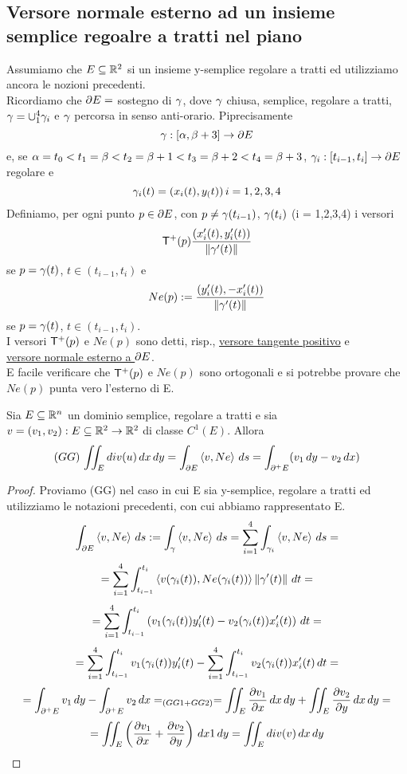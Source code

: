 \subsection{Versore normale esterno ad un insieme semplice regoalre a tratti nel piano}
Assumiamo che $E\subseteq\mathbb{R}^2$ si un insieme y-semplice regolare a tratti ed utilizziamo 
ancora le nozioni precedenti.\\
Ricordiamo che $\partial E = $ sostegno di $\gamma$, dove $\gamma$ \ace chiusa, semplice, regolare 
a tratti, $\gamma = \cup_{1}^{4} \gamma_i$ e $\gamma$ \ace percorsa in senso anti-orario. 
Pi\acu precisamente 
$$\gamma:[\alpha,\beta+3] \to \partial E$$
e, se $\alpha = t_0 < t_1 = \beta < t_2 = \beta + 1 < t_3 = \beta+2 < t_4 = \beta +3$,
$\gamma_i : [t_{i-1},t_i]\to \partial E$ regolare e 
$$\gamma_i(t) = (x_i(t),y_(t)) \, i = 1,2,3,4$$
Definiamo, per ogni punto $p\in \partial E$, con $p \neq \gamma(t_{i-1})$, $\gamma(t_i)$
(i = 1,2,3,4) i versori 
$$\mathsf{T}^+(p) \frac{(x_i'(t),y_i'(t))}{\left\lVert\gamma'(t)\right\rVert}$$
se $p = \gamma(t)$, $t \in (t_{i-1},t_i)$ e 
$$Ne(p) := \frac{(y_i'(t), -x_i'(t))}{\left\lVert\gamma'(t)\right\rVert}$$
se $p = \gamma(t)$, $t\in(t_{i-1},t_i)$. \\
I versori $\mathsf{T}^+(p)$ e $Ne(p)$ sono detti, risp., \underline{versore tangente positivo} e  \\
\underline{versore normale esterno a $\partial E$}. \\
\ac{E} facile verificare che $\mathsf{T}^+(p)$ e $Ne(p)$ sono ortogonali e si potrebbe 
provare che $Ne(p)$ punta vero l'esterno di E. 
\begin{theorem}
  Sia $E\subseteq\mathbb{R}^n$ un dominio semplice, regolare a tratti e sia $v=(v_1,v_2):E\subseteq\mathbb{R}^2\to\mathbb{R}^2$
  di classe $C^1(E)$. Allora 
  $$(GG)\, \iint_{E} div(u)\,dx\,dy = \int_{\partial E} \left\langle v,Ne \right\rangle\,ds = \int_{\partial^+ E} (v_1\,dy-v_2\,dx)$$
  \begin{proof}
    Proviamo (GG) nel caso in cui E sia y-semplice, regolare a tratti ed utilizziamo le notazioni precedenti, con cui abbiamo rappresentato E.
    $$\int_{\partial E} \left\langle v,Ne \right\rangle \,ds := \int_{\gamma} \left\langle v,Ne \right\rangle \,ds = \sum_{i=1}^4 \int_{\gamma_i} \left\langle v,Ne \right\rangle\,ds = $$
    $$= \sum_{i=1}^4 \int_{t_{i-1}}^{t_i} \left\langle v(\gamma_i(t)),Ne(\gamma_i(t)) \right\rangle\left\lVert\gamma'(t)\right\rVert\,dt = $$
    $$= \sum_{i=1}^4 \int_{t_{i-1}}^{t_i} \left(v_1(\gamma_i(t))y_i'(t) - v_2(\gamma_i(t))x_i'(t)\right)\,dt = $$
    $$= \sum_{i=1}^4 \int_{t_{i-1}}^{t_i} v_1(\gamma_i(t))y_i'(t) - \sum_{i=1}^4 \int_{t_{i-1}}^{t_i} v_2(\gamma_i(t))x_i'(t)\,dt = $$
    $$= \int_{\partial^+ E} v_1\,dy - \int_{\partial^+ E} v_2\,dx =_{(GG1+GG2)} = 
        \iint_{E} \frac{\partial v_1}{\partial x}\,dx\,dy + \iint_{E} \frac{\partial v_2}{\partial y}\,dx\,dy = $$
    $$= \iint_{E} \left(\frac{\partial v_1}{\partial x}+\frac{\partial v_2}{\partial y}\right)\,dx1\,dy = \iint_{E} div(v) \,dx\,dy$$
  \end{proof}
\end{theorem}
